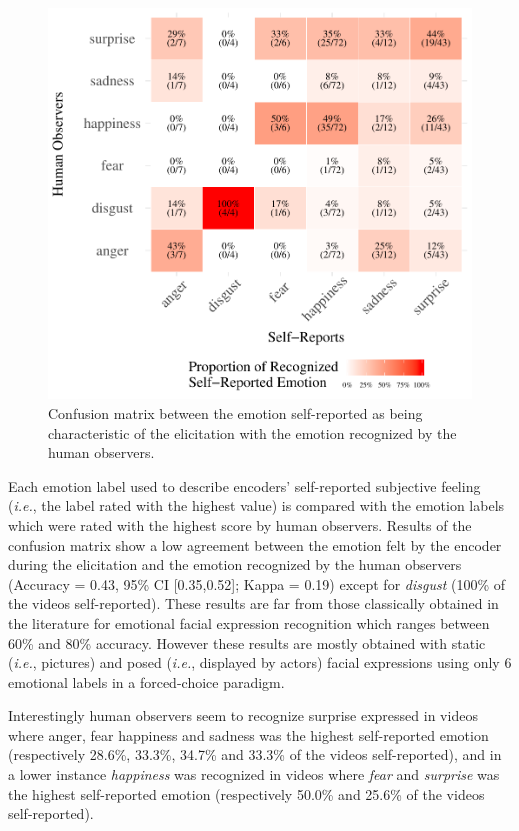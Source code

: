 \documentclass[man]{apa6}
\begin{document}
\begin{figure}[!h]
\includegraphics[width=\textwidth]{manuscript_apa_files/figure-latex/confusionMatrix-sr-hr-1} \caption{Confusion matrix between the emotion self-reported as being characteristic of the elicitation with the emotion recognized by the human observers.}\label{fig:confusionMatrix-sr-hr}
\end{figure}

Each emotion label used to describe encoders' self-reported subjective feeling (\emph{i.e.}, the label rated with the highest value) is compared with the emotion labels which were rated with the highest score by human observers. Results of the confusion matrix show a low agreement between the emotion felt by the encoder during the elicitation and the emotion recognized by the human observers (Accuracy = 0.43, 95\% CI {[}0.35,0.52{]}; Kappa = 0.19) except for \emph{disgust} (100\% of the videos self-reported). These results are far from those classically obtained in the literature for emotional facial expression recognition which ranges between 60\% and 80\% accuracy. However these results are mostly obtained with static (\emph{i.e.}, pictures) and posed (\emph{i.e.}, displayed by actors) facial expressions using only 6 emotional labels in a forced-choice paradigm.

Interestingly human observers seem to recognize surprise expressed in videos where anger, fear happiness and sadness was the highest self-reported emotion (respectively 28.6\%, 33.3\%, 34.7\% and 33.3\% of the videos self-reported), and in a lower instance \emph{happiness} was recognized in videos where \emph{fear} and \emph{surprise} was the highest self-reported emotion (respectively 50.0\% and 25.6\% of the videos self-reported).
\end{document}
